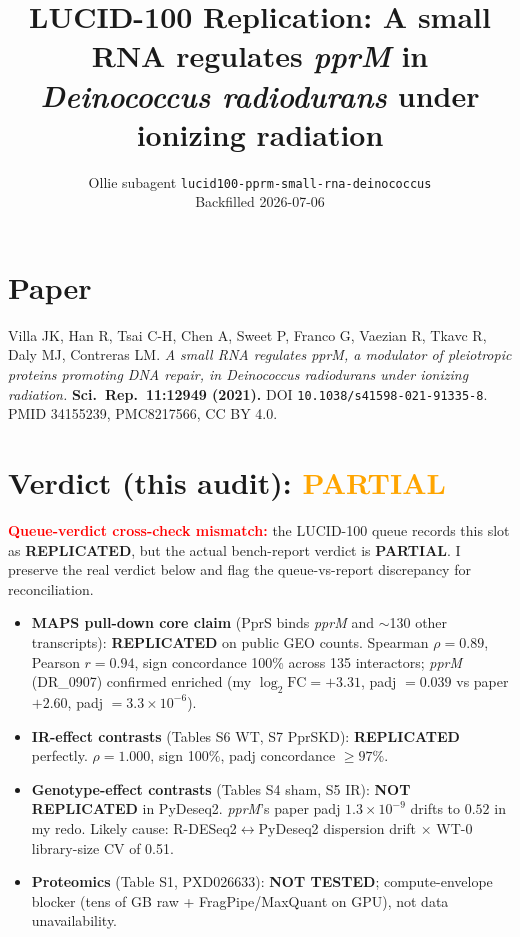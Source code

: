 \documentclass[11pt]{article}
\title{LUCID-100 Replication: A small RNA regulates \emph{pprM} in \emph{Deinococcus radiodurans} under ionizing radiation}
\author{Ollie subagent \texttt{lucid100-pprm-small-rna-deinococcus}\\Backfilled 2026-07-06}
\date{}
\begin{document}
\maketitle

\section*{Paper}
Villa JK, Han R, Tsai C-H, Chen A, Sweet P, Franco G, Vaezian R, Tkavc R, Daly MJ, Contreras LM. \emph{A small RNA regulates pprM, a modulator of pleiotropic proteins promoting DNA repair, in Deinococcus radiodurans under ionizing radiation.} \textbf{Sci.\ Rep.\ 11:12949 (2021).} DOI \texttt{10.1038/s41598-021-91335-8}. PMID 34155239, PMC8217566, CC BY 4.0.

\section*{Verdict (this audit): \textcolor{orange}{PARTIAL}}
\textbf{\textcolor{red}{Queue-verdict cross-check mismatch:}} the LUCID-100 queue records this slot as \textbf{REPLICATED}, but the actual bench-report verdict is \textbf{PARTIAL}. I preserve the real verdict below and flag the queue-vs-report discrepancy for reconciliation.

\begin{itemize}
  \item \textbf{MAPS pull-down core claim} (PprS binds \emph{pprM} and $\sim$130 other transcripts): \textbf{REPLICATED} on public GEO counts. Spearman $\rho = 0.89$, Pearson $r = 0.94$, sign concordance 100\% across 135 interactors; \emph{pprM} (DR\_0907) confirmed enriched (my $\log_2\text{FC} = +3.31$, padj $= 0.039$ vs paper $+2.60$, padj $= 3.3 \times 10^{-6}$).
  \item \textbf{IR-effect contrasts} (Tables S6 WT, S7 PprSKD): \textbf{REPLICATED} perfectly. $\rho = 1.000$, sign 100\%, padj concordance $\geq 97\%$.
  \item \textbf{Genotype-effect contrasts} (Tables S4 sham, S5 IR): \textbf{NOT REPLICATED} in PyDeseq2. \emph{pprM}'s paper padj $1.3\times10^{-9}$ drifts to $0.52$ in my redo. Likely cause: R-DESeq2$\leftrightarrow$PyDeseq2 dispersion drift $\times$ WT-0 library-size CV of 0.51.
  \item \textbf{Proteomics} (Table S1, PXD026633): \textbf{NOT TESTED}; compute-envelope blocker (tens of GB raw + FragPipe/MaxQuant on GPU), not data unavailability.
\end{itemize}
\end{document}
